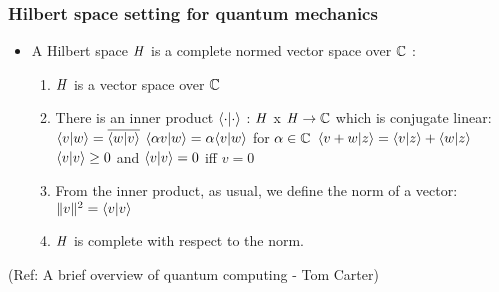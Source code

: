 

 \begin{frame}[fragile]\frametitle{Hilbert space setting for quantum mechanics}

\begin{itemize}
	\item A Hilbert space $\mathit{H}$ is a complete normed vector space over $\mathbb{C}$ :
	\begin{enumerate}
		\item $\mathit{H}$ is a vector space over $\mathbb{C}$
		\item There is an inner product \newline
			$\langle{\cdot}|{\cdot}\rangle$ : $\mathit{H}$ x $\mathit{H} \rightarrow \mathbb{C}$
			\newline
			which is conjugate linear: \newline
			$\langle{v}|{w}\rangle = \overline{\langle{w}|{v}\rangle} $  \newline
			$\langle{\alpha v}|{w}\rangle = \alpha \langle{v}|{w}\rangle $
				for $\alpha \in \mathbb{C}$ \newline
			$\langle{v+w}|{z}\rangle = \langle{v}|{z}\rangle + \langle{w}|{z}\rangle $ \newline
			$\langle{v}|{v}\rangle \ge 0$ \newline
			and \newline
			$\langle{v}|{v}\rangle = 0$ iff $v = 0$
		\item From the inner product, as usual, we define the norm of a vector: \newline
			$ \Vert v \Vert ^ 2 = \langle{v}|{v}\rangle $
		\item $\mathit{H}$ is complete with respect to the norm.
	\end{enumerate}
	
\end{itemize}

\tiny{(Ref: A brief overview of quantum computing - Tom Carter)}

\end{frame}


